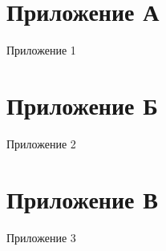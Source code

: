 
\chapter{Приложение А}
\label{app:app1}
Приложение 1

\chapter{Приложение Б}
\label{app:app2}
Приложение 2

\chapter{Приложение В}
\label{app:app1}
Приложение 3